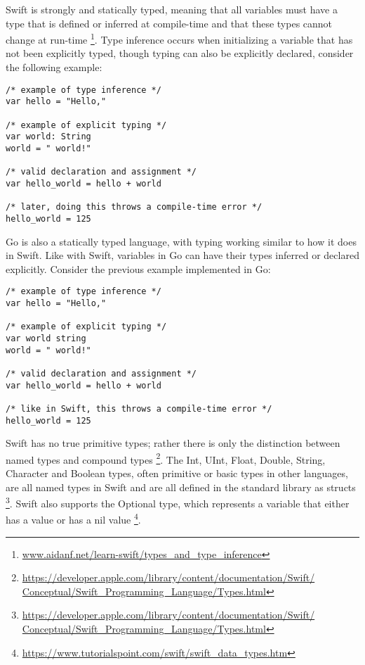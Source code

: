 \documentclass[letterpaper]{article}
\begin{document}
Swift is strongly and statically typed, meaning that all variables must have a type that is defined or inferred at compile-time and that these types cannot change at run-time \footnote{\url{www.aidanf.net/learn-swift/types_and_type_inference}}. Type inference occurs when initializing a variable that has not been explicitly typed, though typing can also be explicitly declared, consider the following example:

\begin{verbatim}
/* example of type inference */
var hello = "Hello,"

/* example of explicit typing */
var world: String
world = " world!"

/* valid declaration and assignment */
var hello_world = hello + world

/* later, doing this throws a compile-time error */
hello_world = 125
\end{verbatim}

Go is also a statically typed language, with typing working similar to how it does in Swift. Like with Swift, variables in Go can have their types inferred or declared explicitly. Consider the previous example implemented in Go:

\begin{verbatim}
/* example of type inference */ 
var hello = "Hello,"

/* example of explicit typing */
var world string
world = " world!"

/* valid declaration and assignment */
var hello_world = hello + world

/* like in Swift, this throws a compile-time error */
hello_world = 125
\end{verbatim}

Swift has no true primitive types; rather there is only the distinction between named types and compound types \footnote{\url{https://developer.apple.com/library/content/documentation/Swift/
Conceptual/Swift_Programming_Language/Types.html}}. The Int, UInt, Float, Double, String, Character and Boolean types, often primitive or basic types in other languages, are all named types in Swift and are all defined in the standard library as structs \footnote{\url{https://developer.apple.com/library/content/documentation/Swift/
Conceptual/Swift_Programming_Language/Types.html}}. Swift also supports the Optional type, which represents a variable that either has a value or has a nil value \footnote{\url{https://www.tutorialspoint.com/swift/swift_data_types.htm}}.
\end{document}
